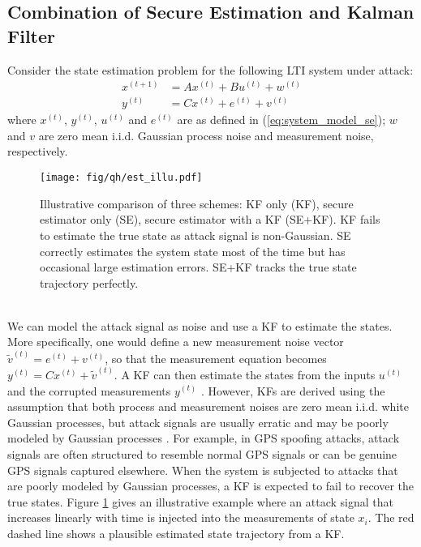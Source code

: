 \documentclass[twocolumn]{autart}    %
\begin{document}
\subsection{Combination of Secure Estimation and Kalman Filter}\label{sec:estimation}
\vspace{-0.4cm}
Consider the state estimation problem for the following LTI system under attack:
\begin{equation}
\begin{aligned}
x^{(t+1)} & = A x^{(t)} + B u^{(t)} + w^{(t)}\\
y^{(t)} & = C x^{(t)} + e^{(t)} + v^{(t)}
\end{aligned}
\label{eq:noise_model}
\end{equation}
where $x^{(t)}$, $y^{(t)}$, $u^{(t)}$ and $e^{(t)}$ are as defined in (\ref{eq:system_model_se});
$w$ and $v$ are zero mean i.i.d. Gaussian process noise and measurement noise, respectively. 
\begin{figure}
\center
\texttt{[image: fig/qh/est\_illu.pdf]}
\caption{Illustrative comparison of three schemes: KF only (KF), secure estimator only (SE), secure estimator with a KF (SE+KF). KF fails to estimate the true state as attack signal is non-Gaussian. SE correctly estimates the system state most of the time but has occasional large estimation errors. SE+KF tracks the true state trajectory perfectly.}
\label{fig:estimation}
\end{figure}
\\We can model the attack signal as noise and use a KF to estimate the states. More specifically, one would define a new measurement noise vector $\tilde{v}^{(t)} = e^{(t)} + v^{(t)}$, so that the measurement equation becomes $y^{(t)} = C x^{(t)} + \tilde{v}^{(t)}$. A KF can then estimate the states from the inputs $u^{(t)}$ and the corrupted measurements $y^{(t)}$ \cite{KwonACC}. However, KFs are derived using the assumption that both process and measurement noises are zero mean i.i.d. white Gaussian processes, but attack signals are usually erratic and may be poorly modeled by Gaussian processes \cite{KwonACC}. For example, in GPS spoofing attacks, attack signals are often structured to resemble normal GPS signals or can be genuine GPS signals captured elsewhere. %
When the system is subjected to attacks that are poorly modeled by Gaussian processes, a KF is expected to fail to recover the true states. Figure \ref{fig:estimation} gives an illustrative example where an attack signal that increases linearly with time is injected into the measurements of state $x_i$. The red dashed line shows a plausible estimated state trajectory from a KF.
\end{document}
